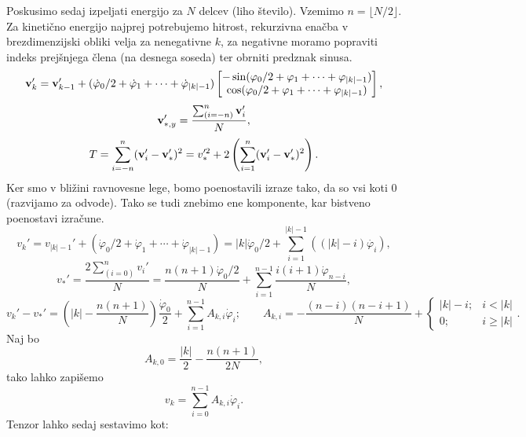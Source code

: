 \documentclass{article}
\begin{document}
Poskusimo sedaj izpeljati energijo za $N$ delcev (liho število). Vzemimo $n=\lfloor N/2\rfloor$. Za kinetično energijo najprej potrebujemo hitrost, rekurzivna enačba v brezdimenzijski obliki velja za nenegativne $k$, za negativne moramo popraviti indeks prejšnjega člena (na desnega soseda) ter obrniti predznak sinusa.
\begin{equation}
    \mathbf{v}_{k}'=\mathbf{v}_{k-1}'+(\dot{\varphi}_0/2+\dot{\varphi}_1+\cdots+\dot{\varphi}_{|k|-1})\begin{bmatrix}
        -\sin(\varphi_0/2+\varphi_1+\cdots+\varphi_{|k|-1})\\
        \cos(\varphi_0/2+\varphi_1+\cdots+\varphi_{|k|-1})
    \end{bmatrix},
\end{equation}
\begin{equation}        
    \mathbf{v}_{*,y}'=\frac{\sum_{(i=-n)}^n\mathbf{v}_i'}{N},
\end{equation}
\begin{equation}
    T=\sum_{i=-n}^n(\mathbf{v}_i'-\mathbf{v}_*')^2=v_*'^2+2\left(\sum_{i=1}^n(\mathbf{v}_i'-\mathbf{v}_*')^2\right).
\end{equation}
Ker smo v bližini ravnovesne lege, bomo poenostavili izraze tako, da so vsi koti 0 (razvijamo za odvode). Tako se tudi znebimo ene komponente, kar bistveno poenostavi izračune.
\begin{equation}
    v_{k}'=v_{|k|-1}'+(\dot{\varphi}_0/2+\dot{\varphi}_1+\cdots+\dot{\varphi}_{|k|-1})=|k|\dot{\varphi}_0/2+\sum_{i=1}^{|k|-1}((|k|-i)\dot{\varphi_i}),
\end{equation}
\begin{equation}
    v_*'=\frac{2\sum_{(i=0)}^nv_i'}{N}=\frac{n(n+1)\dot{\varphi}_0/2}{N}+\sum_{i=1}^{n-1}\frac{i(i+1)\dot{\varphi}_{n-i}}{N},
\end{equation}
\begin{equation}
    v_{k}'-v_*'=\left(|k|-\frac{n(n+1)}{N}\right)\frac{\dot{\varphi}_0}{2}+\sum_{i=1}^{n-1}A_{k,i}\dot{\varphi}_i;\qquad A_{k,i}=-\frac{(n-i)(n-i+1)}{N}+\begin{cases}
        |k|-i; & i<|k|\\
        0; & i\ge|k|
    \end{cases}.
\end{equation}
Naj bo $$A_{k,0}=\frac{|k|}{2}-\frac{n(n+1)}{2N},$$
tako lahko zapišemo
\begin{equation}
    v_k=\sum_{i=0}^{n-1}A_{k,i}\dot{\varphi}_i.
\end{equation}
Tenzor lahko sedaj sestavimo kot:
\end{document}
